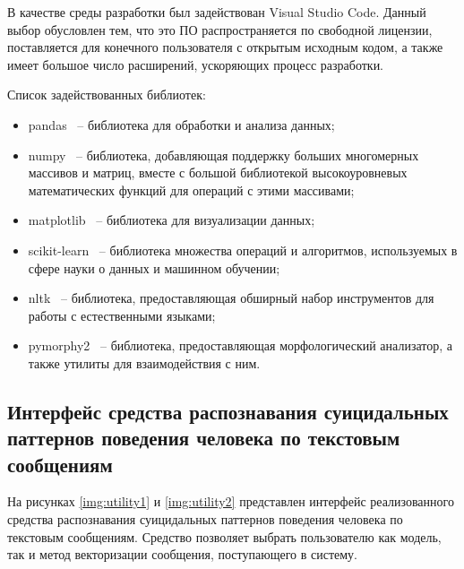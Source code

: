 В качестве среды разработки был задействован Visual Studio Code. Данный выбор обусловлен тем, что это ПО распространяется по свободной лицензии, поставляется для конечного пользователя с открытым исходным кодом, а также имеет большое число расширений, ускоряющих процесс разработки.

Список задействованных библиотек:
\begin{itemize}
	\item pandas~\cite{pandas} -- библиотека для обработки и анализа данных;
	\item numpy~\cite{numpy} -- библиотека, добавляющая поддержку больших многомерных массивов и матриц, вместе с большой библиотекой высокоуровневых математических функций для операций с этими массивами;
	\item matplotlib~\cite{matplotlib} -- библиотека для визуализации данных;
	\item scikit-learn~\cite{sklearn} -- библиотека множества операций и алгоритмов, используемых в сфере науки о данных и машинном обучении;
	\item nltk~\cite{nltk} -- библиотека, предоставляющая обширный набор инструментов для работы с естественными языками;
	\item pymorphy2~\cite{pymorphy} -- библиотека, предоставляющая морфологический анализатор, а также утилиты для взаимодействия с ним.
\end{itemize}

\subsection{Интерфейс средства распознавания суицидальных паттернов поведения человека по текстовым сообщениям}

На рисунках \ref{img:utility1} и \ref{img:utility2} представлен интерфейс реализованного средства распознавания суицидальных паттернов поведения человека по текстовым сообщениям. Средство позволяет выбрать пользователю как модель, так и метод векторизации сообщения, поступающего в систему.


